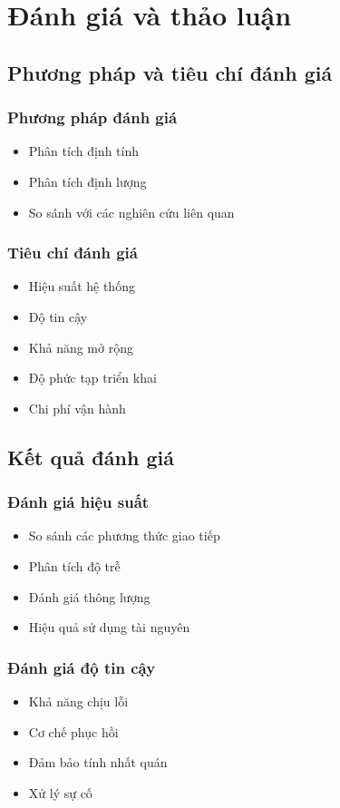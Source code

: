 \chapter{Đánh giá và thảo luận}

\section{Phương pháp và tiêu chí đánh giá}
\subsection{Phương pháp đánh giá}
\begin{itemize}
    \item Phân tích định tính
    \item Phân tích định lượng
    \item So sánh với các nghiên cứu liên quan
\end{itemize}

\subsection{Tiêu chí đánh giá}
\begin{itemize}
    \item Hiệu suất hệ thống
    \item Độ tin cậy
    \item Khả năng mở rộng
    \item Độ phức tạp triển khai
    \item Chi phí vận hành
\end{itemize}

\section{Kết quả đánh giá}
\subsection{Đánh giá hiệu suất}
\begin{itemize}
    \item So sánh các phương thức giao tiếp
    \item Phân tích độ trễ
    \item Đánh giá thông lượng
    \item Hiệu quả sử dụng tài nguyên
\end{itemize}

\subsection{Đánh giá độ tin cậy}
\begin{itemize}
    \item Khả năng chịu lỗi
    \item Cơ chế phục hồi
    \item Đảm bảo tính nhất quán
    \item Xử lý sự cố
\end{itemize}

